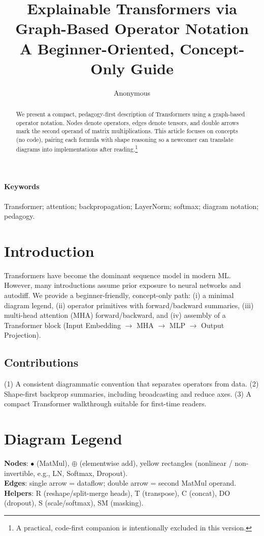 \documentclass[10pt]{article}
\title{Explainable Transformers via Graph-Based Operator Notation\\\large A Beginner-Oriented, Concept-Only Guide}
\author{Anonymous}
\date{} %
\begin{document}
\maketitle

\begin{abstract}
We present a compact, pedagogy-first description of Transformers using a graph-based operator notation. Nodes denote operators, edges denote tensors, and double arrows mark the second operand of matrix multiplications. This article focuses on concepts (no code), pairing each formula with shape reasoning so a newcomer can translate diagrams into implementations after reading.\footnote{A practical, code-first companion is intentionally excluded in this version.}
\end{abstract}

\paragraph{Keywords} Transformer; attention; backpropagation; LayerNorm; softmax; diagram notation; pedagogy.

\section{Introduction}
Transformers have become the dominant sequence model in modern ML. However, many introductions assume prior exposure to neural networks and autodiff. We provide a beginner-friendly, concept-only path: (i) a minimal diagram legend, (ii) operator primitives with forward/backward summaries, (iii) multi-head attention (MHA) forward/backward, and (iv) assembly of a Transformer block (Input Embedding $\rightarrow$ MHA $\rightarrow$ MLP $\rightarrow$ Output Projection).

\subsection{Contributions}
(1) A consistent diagrammatic convention that separates operators from data. (2) Shape-first backprop summaries, including broadcasting and reduce axes. (3) A compact Transformer walkthrough suitable for first-time readers.

\section{Diagram Legend}
\textbf{Nodes}: $\bullet$ (MatMul), $\oplus$ (elementwise add), yellow rectangles (nonlinear / non-invertible, e.g., LN, Softmax, Dropout).\\
\textbf{Edges}: single arrow = dataflow; double arrow = second MatMul operand.\\
\textbf{Helpers}: R (reshape/split-merge heads), T (transpose), C (concat), DO (dropout), S (scale/softmax), SM (masking).
\end{document}
